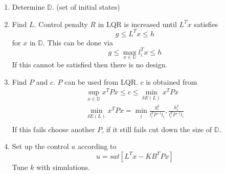 \begin{enumerate} 
    \item Determine $\mathbb{D}$. (set of initial states)
    \item Find $L$. Control penalty $R$ in LQR is increased until $L^Tx$ satisfies
    \begin{equation}
        g\leq L^Tx\leq h
    \end{equation}
    for $x$ in $\mathbb{D}$. This can be done via
    \begin{equation}
        g\leq\max_{x\in\mathbb{D}}l_i^Tx\leq h
    \end{equation}
    If this cannot be satisfied then there is no design.
    \item Find $P$ and $c$. $P$ can be used from LQR. $c$ is obtained from
    \begin{equation}
    \begin{split}
        \sup_{x\in\mathbb{D}}x^TPx\leq c\leq \min_{\delta E(L)}x^TPx\\
        \min_{\delta E(L)}x^TPx=\min_i{\frac{g_i^2}{l_i^TP^{-1}l_i},\frac{h_i^2}{l_i^TP^{-1}l_i}}\\
    \end{split}
    \end{equation}
    If this fails choose another $P$, if it still fails cut down the size of $\mathbb{D}$.
    \item Set up the control $u$ according to 
    \begin{equation}
        u=sat[L^Tx-KB^TPx]
    \end{equation}
    Tune $k$ with simulations.
\end{enumerate}

